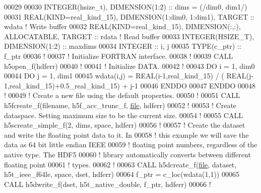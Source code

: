 \begin{DoxyCode}
00029 
00030   \textcolor{keywordtype}{INTEGER(hsize\_t)},   \textcolor{keywordtype}{DIMENSION(1:2)} :: dims = (/dim0, dim1/)
00031   \textcolor{keywordtype}{REAL(KIND=real\_kind\_15)}, \textcolor{keywordtype}{DIMENSION(1:dim0, 1:dim1)}, \textcolor{keywordtype}{TARGET} :: wdata \textcolor{comment}{! Write buffer}
00032   \textcolor{keywordtype}{REAL(KIND=real\_kind\_15)}, \textcolor{keywordtype}{DIMENSION(:,:)}, \textcolor{keywordtype}{ALLOCATABLE}, \textcolor{keywordtype}{TARGET} :: rdata \textcolor{comment}{! Read buffer}
00033   \textcolor{keywordtype}{INTEGER(HSIZE\_T)}, \textcolor{keywordtype}{DIMENSION(1:2)} :: maxdims
00034   \textcolor{keywordtype}{INTEGER} :: i, j
00035   \textcolor{keywordtype}{TYPE}(c\_ptr) :: f\_ptr
00036   \textcolor{comment}{!}
00037   \textcolor{comment}{! Initialize FORTRAN interface.}
00038   \textcolor{comment}{!}
00039   \textcolor{keyword}{CALL }h5open\_f(hdferr)
00040   \textcolor{comment}{!}
00041   \textcolor{comment}{! Initialize DATA.}
00042   \textcolor{comment}{!}
00043   \textcolor{keywordflow}{DO} i = 1, dim0
00044      \textcolor{keywordflow}{DO} j = 1, dim1
00045         wdata(i,j) = \textcolor{keywordtype}{REAL(i-1,real\_kind\_15)} / ( \textcolor{keywordtype}{REAL}(j-1,real\_kind\_15)+0.5\_real\_kind\_15) + j-1
00046 \textcolor{keywordflow}{     ENDDO}
00047 \textcolor{keywordflow}{  ENDDO}
00048   \textcolor{comment}{!}
00049   \textcolor{comment}{! Create a new file using the default properties.}
00050   \textcolor{comment}{!}
00051   \textcolor{keyword}{CALL }h5fcreate\_f(filename, h5f\_acc\_trunc\_f, \hyperlink{structfile}{file}, hdferr)
00052   \textcolor{comment}{!}
00053   \textcolor{comment}{! Create dataspace.  Setting maximum size to be the current size.}
00054   \textcolor{comment}{!}
00055   \textcolor{keyword}{CALL }h5screate\_simple\_f(2, dims, space, hdferr)
00056   \textcolor{comment}{!}
00057   \textcolor{comment}{! Create the dataset and write the floating point data to it.  In}
00058   \textcolor{comment}{! this example we will save the data as 64 bit little endian IEEE}
00059   \textcolor{comment}{! floating point numbers, regardless of the native type.  The HDF5}
00060   \textcolor{comment}{! library automatically converts between different floating point}
00061   \textcolor{comment}{! types.}
00062   \textcolor{comment}{!}
00063   \textcolor{keyword}{CALL }h5dcreate\_f(\hyperlink{structfile}{file}, dataset, h5t\_ieee\_f64le, space, dset, hdferr)
00064   f\_ptr = c\_loc(wdata(1,1))
00065   \textcolor{keyword}{CALL }h5dwrite\_f(dset, h5t\_native\_double, f\_ptr, hdferr)
00066   \textcolor{comment}{!}

\end{DoxyCode}
